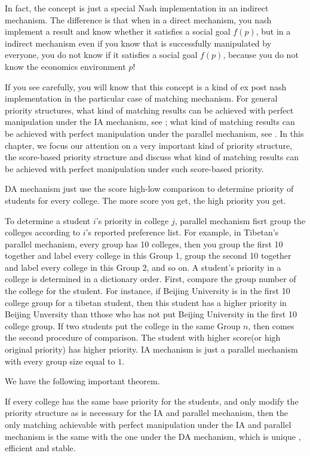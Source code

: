 In fact, the concept is just a special Nash implementation in
an indirect mechanism. The difference is that when in a direct
mechanism, you nash implement a result and know whether it satisfies a
social goal $f(p)$, but in a indirect mechanism even if you know that
is successfully manipulated by everyone, you do not know if it
satisfies a social goal $f(p)$, because you do not know the economics
environment $p$!


If you see carefully, you will know that this concept is  a kind of ex post nash
implementation in the particular case of matching mechanism.  For
general priority structures, what
kind of matching results can be achieved with perfect manipulation
under the IA mechanism, see \parencite{Ergin2006}; what kind of
matching results can be achieved with perfect manipulation under the
parallel mechanism, see \parencite{YanChenJPE}.  In this chapter, we
focus our attention on a very important kind of priority structure,
the score-based priority structure and discuss what kind of matching
results can be achieved with perfect manipulation under such
score-based priority. 

DA mechanism just use the score high-low comparison to determine
priority of students for every college. The more score you get, the
high priority you get.

To determine a student $i$'s priority in college $j$, parallel
mechanism fisrt group the colleges according to $i$'s reported
preference list. For example, in Tibetan's parallel mechanism, every
group has 10 colleges, then you group the first 10 together and label
every college in this Group 1, group the second 10 together and label
every college in this Group 2, and so on. A student's priority in a
college is determined in a dictionary order. First, compare the group
number of the college for the student. For instance, if Beijing
University is in the first 10 college group for a tibetan student, 
then this student has a higher priority in Beijing Unversity than
tthose who has not put  Beijing University in the first 10 college
group. If two students put the college in the same Group $n$, then
comes the second procedure of comparison. The student with higher
score(or high original priority) has higher priority. IA mechanism is
just a parallel mechanism with every group size equal to $1$.


We have the following important theorem.

\begin{thm}\label{same}
If every college has the same base priority for the students, and only
modify the priority structure as is necessary for the IA and parallel
mechanism, then the only matching achievable with perfect
manipulation under the IA and parallel mechanism  is the same with the one under  the DA mechanism, which is  unique , efficient and stable. 
\end{thm}


